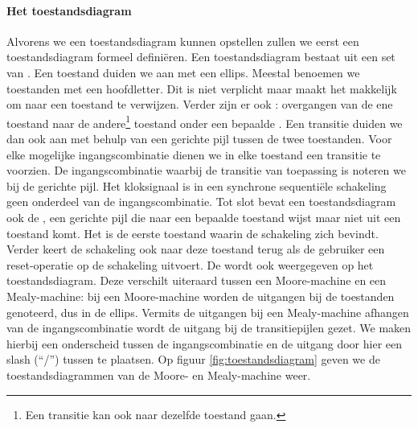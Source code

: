 \paragraph{Het toestandsdiagram} Alvorens we een toestandsdiagram kunnen opstellen zullen we eerst een toestandsdiagram formeel defini\"eren. Een toestandsdiagram bestaat uit een set van . Een toestand duiden we aan met een ellips. Meestal benoemen we toestanden met een hoofdletter. Dit is niet verplicht maar maakt het makkelijk om naar een toestand te verwijzen. Verder zijn er ook : overgangen van de ene toestand naar de andere\footnote{Een transitie kan ook naar dezelfde toestand gaan.} toestand onder een bepaalde . Een transitie duiden we dan ook aan met behulp van een gerichte pijl tussen de twee toestanden. Voor elke mogelijke ingangscombinatie dienen we in elke toestand een transitie te voorzien. De ingangscombinatie waarbij de transitie van toepassing is noteren we bij de gerichte pijl. Het kloksignaal is in een synchrone sequenti\"ele schakeling geen onderdeel van de ingangscombinatie. Tot slot bevat een toestandsdiagram ook de , een gerichte pijl die naar een bepaalde toestand wijst maar niet uit een toestand komt. Het is de eerste toestand waarin de schakeling zich bevindt. Verder keert de schakeling ook naar deze toestand terug als de gebruiker een reset-operatie op de schakeling uitvoert. De  wordt ook weergegeven op het toestandsdiagram. Deze verschilt uiteraard tussen een Moore-machine en een Mealy-machine: bij een Moore-machine worden de uitgangen bij de toestanden genoteerd, dus in de ellips. Vermits de uitgangen bij een Mealy-machine afhangen van de ingangscombinatie wordt de uitgang bij de transitiepijlen gezet. We maken hierbij een onderscheid tussen de ingangscombinatie en de uitgang door hier een slash (``/'') tussen te plaatsen. Op figuur \ref{fig:toestandsdiagram} geven we de toestandsdiagrammen van de Moore- en Mealy-machine weer.
